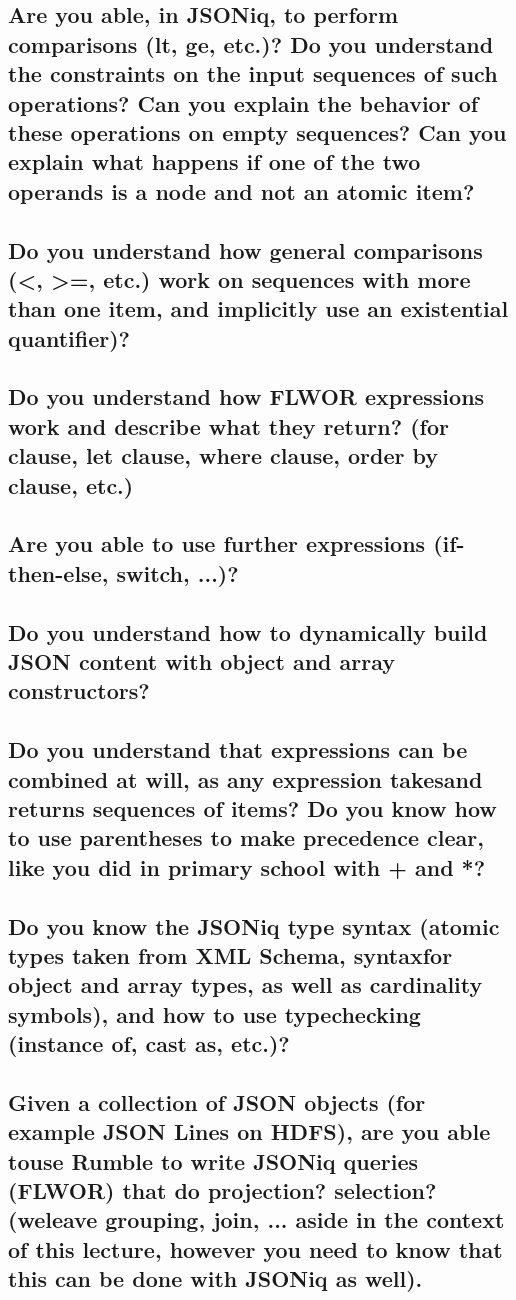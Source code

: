 \documentclass{article}
\begin{document}
\subsection{Are you able, in JSONiq, to perform comparisons (lt, ge, etc.)? Do you understand the constraints on the input sequences of such operations? Can you explain the behavior of these operations on empty sequences? Can you explain what happens if one of the two operands is a node and not an atomic item?}
\subsection{Do you understand how general comparisons (<, >=, etc.) work on sequences with more than one item, and implicitly use an existential quantifier)?}
\subsection{Do you understand how FLWOR expressions work and describe what they return? (for clause, let clause, where clause, order by clause, etc.)}
\subsection{Are you able to use further expressions (if-then-else, switch, ...)?}
\subsection{Do you understand how to dynamically build JSON content with object and array constructors?}
\subsection{Do you understand that expressions can be combined at will, as any expression takesand returns sequences of items? Do you know how to use parentheses to make precedence clear, like you did in primary school with + and *?}
\subsection{Do you know the JSONiq type syntax (atomic types taken from XML Schema, syntaxfor object and array types, as well as cardinality symbols), and how to use typechecking (instance of, cast as, etc.)?}
\subsection{Given a collection of JSON objects (for example JSON Lines on HDFS), are you able touse Rumble to write JSONiq queries (FLWOR) that do projection? selection? (weleave grouping, join, ... aside in the context of this lecture, however you need to know that this can be done with JSONiq as well).}

\end{document}
